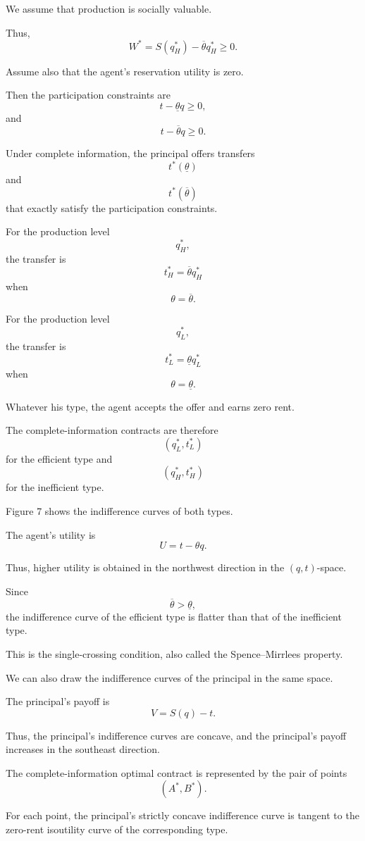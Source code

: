 We assume that production is socially valuable.

Thus,
\[
W^*
=
S(q^*_H)-\overline{\theta}q^*_H
\ge 0.
\]

Assume also that the agent's reservation utility is zero.

Then the participation constraints are
\[
t-\underline{\theta}q\ge 0,
\]
and
\[
t-\overline{\theta}q\ge 0.
\]

Under complete information, the principal offers transfers
\[
t^*(\underline{\theta})
\]
and
\[
t^*(\overline{\theta})
\]
that exactly satisfy the participation constraints.



For the production level
\[
q^*_H,
\]
the transfer is
\[
t^*_H=\overline{\theta}q^*_H
\]
when
\[
\theta=\overline{\theta}.
\]

For the production level
\[
q^*_L,
\]
the transfer is
\[
t^*_L=\underline{\theta}q^*_L
\]
when
\[
\theta=\underline{\theta}.
\]

Whatever his type, the agent accepts the offer and earns zero rent.

The complete-information contracts are therefore
\[
(q^*_L,t^*_L)
\]
for the efficient type and
\[
(q^*_H,t^*_H)
\]
for the inefficient type.

Figure 7 shows the indifference curves of both types.

The agent's utility is
\[
U=t-\theta q.
\]

Thus, higher utility is obtained in the northwest direction in the \((q,t)\)-space.

Since
\[
\overline{\theta}>\underline{\theta},
\]
the indifference curve of the efficient type is flatter than that of the inefficient type.

This is the single-crossing condition, also called the Spence--Mirrlees property.

We can also draw the indifference curves of the principal in the same space.

The principal's payoff is
\[
V=S(q)-t.
\]

Thus, the principal's indifference curves are concave, and the principal's payoff increases in the southeast direction.

The complete-information optimal contract is represented by the pair of points
\[
(A^*,B^*).
\]

For each point, the principal's strictly concave indifference curve is tangent to the zero-rent isoutility curve of the corresponding type.


